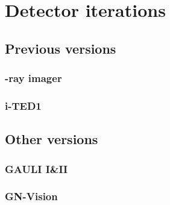 \chapter{Detector iterations}\label{ch:evolution}

\section{Previous versions}

\subsection{\textgamma-ray imager}

\subsection{i-TED1}

\section{Other versions}

\subsection{GAULI I\&II}

\subsection{GN-Vision}
